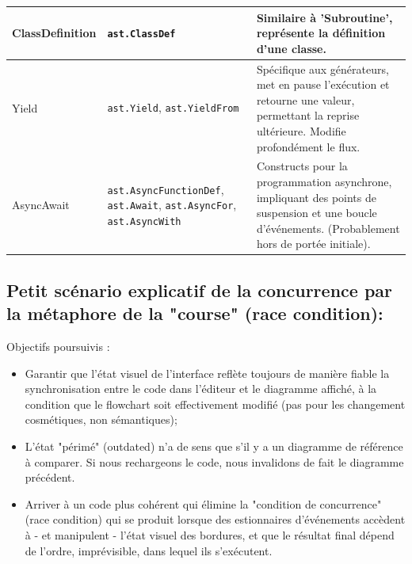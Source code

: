 \documentclass[11pt,a4paper]{article}
\begin{document}
\begin{longtable}{| p{4cm} | p{4cm} | p{7cm} |}
ClassDefinition & \texttt{ast.ClassDef} & Similaire à 'Subroutine', représente la définition d'une classe. \\ \hline
Yield & \texttt{ast.Yield}, \texttt{ast.YieldFrom} & Spécifique aux générateurs, met en pause l'exécution et retourne une valeur, permettant la reprise ultérieure. Modifie profondément le flux. \\ \hline
AsyncAwait & \texttt{ast.AsyncFunctionDef}, \texttt{ast.Await}, \texttt{ast.AsyncFor}, \texttt{ast.AsyncWith} & Constructs pour la programmation asynchrone, impliquant des points de suspension et une boucle d'événements. (Probablement hors de portée initiale). \\ \hline
\end{longtable}

\newpage

\subsection{Petit scénario explicatif de la concurrence par la métaphore de la "course" (race condition):}
Objectifs poursuivis : 
\begin{itemize}
    \item Garantir que l'état visuel de l'interface reflète toujours de manière fiable la synchronisation entre le code dans l'éditeur et le diagramme affiché, à la condition que le flowchart soit effectivement modifié (pas pour les changement cosmétiques, non sémantiques); 
    \item L'état "périmé" (outdated) n'a de sens que s'il y a un diagramme de référence à comparer. Si nous rechargeons le code, nous invalidons de fait le diagramme précédent.
    \item Arriver à un code plus cohérent qui élimine la "condition de concurrence" (race condition) qui se produit lorsque des estionnaires d'événements accèdent à - et manipulent - l'état visuel des bordures, et que le résultat final dépend de l'ordre, imprévisible, dans lequel ils s'exécutent. 
\end{itemize}
\end{document}
